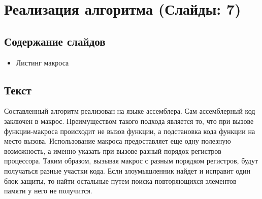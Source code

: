 
\section{Реализация алгоритма (Слайды: 7)}

\subsection{Содержание слайдов}

\begin{itemize}
  \item Листинг макроса
\end{itemize}

\subsection{Текст}

Составленный алгоритм реализован на языке ассемблера. Сам ассемблерный код
заключен в макрос. Преимуществом такого подхода является то, что при вызове
функции-макроса происходит не вызов функции, а подстановка кода функции на место
вызова. Использование макроса предоставляет еще одну полезную возможность, а
именно указать при вызове разный порядок регистров процессора. Таким образом,
вызывая макрос с разным порядком регистров, будут получаться разные участки
кода. Если злоумышленник найдет и исправит один блок защиты, то найти остальные
путем поиска повторяющихся элементов памяти у него не получится.


